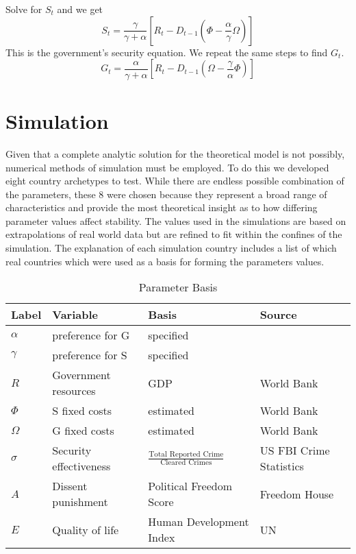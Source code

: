\documentclass[12pt]{article}
\begin{document}
\begin{spacing}{1.5}
\noindent Solve for $S_t$ and we get
\begin{equation}
S_t=\frac{\gamma }{\gamma  +\alpha} \left[ R_t - D_{t-1} \left(\Phi - \frac{\alpha}{\gamma }\Omega \right) \right]
\end{equation}
\noindent This is the government's security equation. We repeat the same steps to find $G_t$. 
\begin{equation}
G_t=\frac{\alpha}{\gamma  +\alpha} \left[ R_t - D_{t-1} \left(\Omega - \frac{\gamma }{\alpha}\Phi \right) \right]
\end{equation}

\section{Simulation} 

Given that a complete analytic solution for the theoretical model is not possibly, numerical methods of simulation must be employed. To do this we developed eight country archetypes to test. While there are endless possible combination of the parameters, these 8 were chosen because they represent a broad range of characteristics and provide the most theoretical insight as to how differing parameter values affect stability. The values used in the simulations are based on extrapolations of real world data but are refined to fit within the confines of the simulation. The explanation of each simulation country includes a list of which real countries which were used as a basis for forming the parameters values. 

\begin{table}[]
\centering
\begin{tiny}
\caption{Parameter Basis}
\begin{tabular}{llll}
\toprule
\textbf{Label} & \textbf{Variable} & \textbf{Basis} & \textbf{Source} \\ \hline
$\alpha$ & preference for G & specified &  \\
\textbf{$\gamma$} & preference for S & specified &  \\
\textbf{$R$} & Government resources & GDP & World Bank \\
$\Phi$ & S fixed costs & estimated & World Bank \\
\textbf{$\Omega$} & G fixed costs & estimated & World Bank \\
\textbf{$\sigma$} & Security effectiveness & $\frac{\text{Total Reported Crime}}{\text{Cleared Crimes}}$ & US FBI Crime Statistics \\
\textbf{$A$} & Dissent punishment & Political Freedom Score & Freedom House \\
\textbf{$E$} & Quality of life & Human Development Index & UN \\ \hline
\end{tabular}
\end{tiny}
\end{table}


\end{spacing}
\end{document}
